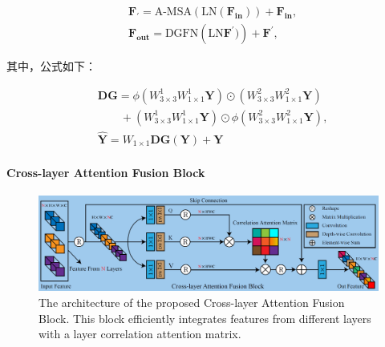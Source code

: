 \documentclass[letterpaper,10pt]{article}
\begin{document}
	\begin{equation}
		\begin{aligned}
			& \mathbf{F}_\prime = \text{A-MSA} \left(\text{LN}(\textbf{F}_\textbf{in})\right) + \mathbf{F}_\mathbf{in}, \\
			& \mathbf{F}_\mathbf{out} = \text{DGFN} \left(\text{LN}\mathbf{F}^\prime)\right) + \mathbf{F}^\prime,
		\end{aligned}
		\label{eq: FFN}
	\end{equation}
	
	其中，公式如下：
	
	\begin{equation}
		\begin{aligned}
			& \mathbf{DG} = \phi \left(W_{3\times 3}^1 W_{1\times1}^1 \mathbf{Y} \right) \odot \left(W_{3\times3}^2 W_{1\times1}^2\mathbf{Y} \right)\\ 
			& \quad \quad  + \left(W_{3\times3}^1W_{1\times1}^1\mathbf{Y}\right) \odot \phi \left(W_{3\times3}^2 W_{1\times1}^2 \mathbf{Y}\right), \\
			& \hat{\mathbf{Y}} = W_{1\times1}\textbf{DG}\left(\mathbf{Y}\right) + \mathbf{Y}
		\end{aligned}
		\label{eq: DGFN}
	\end{equation}
	
	\paragraph{Cross-layer Attention Fusion Block}
	
	\begin{figure}[htbp]
		\centering 
		\includegraphics[width=\columnwidth]{picture/Cross-layer_Attention_Fusion_Block}
		\captionsetup{font=scriptsize}
		\caption{
			\label{fig: Cross-layer_Attention_Fusion_Block} %
			The architecture of the proposed Cross-layer Attention Fusion Block. This block efficiently integrates features from different layers with a layer correlation attention matrix.
		}
	\end{figure}
	
\end{document}
